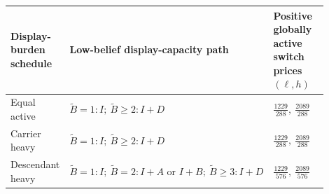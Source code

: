 \begin{tabular}{@{}p{0.19\linewidth}p{0.43\linewidth}p{0.28\linewidth}@{}}
\toprule
Display-burden schedule & Low-belief display-capacity path & Positive globally active switch prices \((\ell,h)\) \\
\midrule
Equal active & \(\widetilde B=1:I;\ \widetilde B\ge2:I{+}D\) & \(\frac{1229}{288},\ \frac{2089}{288}\) \\
Carrier heavy & \(\widetilde B=1:I;\ \widetilde B\ge2:I{+}D\) & \(\frac{1229}{288},\ \frac{2089}{288}\) \\
Descendant heavy & \(\widetilde B=1:I;\ \widetilde B=2:I{+}A\text{ or }I{+}B;\ \widetilde B\ge3:I{+}D\) & \(\frac{1229}{576},\ \frac{2089}{576}\) \\
\bottomrule
\end{tabular}
